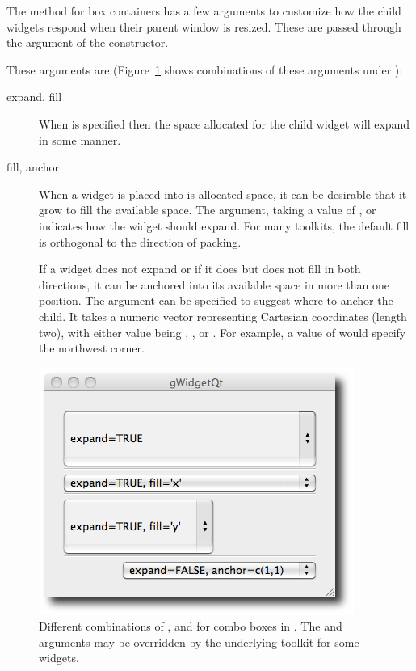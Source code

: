 The  method for box containers has a few arguments to
customize how the child widgets respond when their parent window is
resized. These are passed through the 
  argument of the constructor.

These arguments are
(Figure~\ref{fig:gWidgets-ggroup-expand-fill-anchor} shows
combinations of these arguments under ):

\begin{description}
\item[expand, fill] When  is specified then the
  space allocated for the child widget will expand in some manner.
  
  
\item[fill, anchor] When a widget is placed into is allocated space,
  it can be desirable that it grow to fill the available space.
  The  argument, taking a value of ,  or
   indicates how the widget should expand. For many
  toolkits, the default fill is orthogonal to the direction of packing.
  
  If a widget does not expand or if it does but does not fill in both
  directions, it can be anchored into its available space in more than
  one position. The  argument can be specified to suggest
  where to anchor the child. It takes a numeric vector representing
  Cartesian coordinates (length two),
  with either value being , , or . For
  example, a value of  would specify the northwest corner.
\end{description}




\begin{figure}
  \centering
  \includegraphics[width=.5\textwidth]{fig-gWidgets-ggroup-expand-fill-anchor}
  \caption{Different combinations of ,  and
     for combo boxes in . The 
    and  arguments
    may be overridden by the underlying toolkit for some widgets.}
  \label{fig:gWidgets-ggroup-expand-fill-anchor}
\end{figure}


